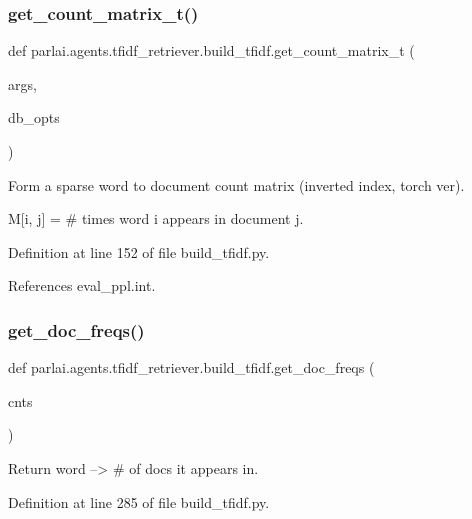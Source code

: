 \subsubsection{\texorpdfstring{get\+\_\+count\+\_\+matrix\+\_\+t()}{get\_count\_matrix\_t()}}
{\footnotesize\ttfamily def parlai.\+agents.\+tfidf\+\_\+retriever.\+build\+\_\+tfidf.\+get\+\_\+count\+\_\+matrix\+\_\+t (\begin{DoxyParamCaption}\item[{}]{args,  }\item[{}]{db\+\_\+opts }\end{DoxyParamCaption})}

\begin{DoxyVerb}Form a sparse word to document count matrix (inverted index, torch ver).

M[i, j] = # times word i appears in document j.
\end{DoxyVerb}
 

Definition at line 152 of file build\+\_\+tfidf.\+py.



References eval\+\_\+ppl.\+int.

\mbox{\label{namespaceparlai_1_1agents_1_1tfidf__retriever_1_1build__tfidf_ac6883ed21006848661f6c748f91aff56}} 
\subsubsection{\texorpdfstring{get\+\_\+doc\+\_\+freqs()}{get\_doc\_freqs()}}
{\footnotesize\ttfamily def parlai.\+agents.\+tfidf\+\_\+retriever.\+build\+\_\+tfidf.\+get\+\_\+doc\+\_\+freqs (\begin{DoxyParamCaption}\item[{}]{cnts }\end{DoxyParamCaption})}

\begin{DoxyVerb}Return word --> # of docs it appears in.\end{DoxyVerb}
 

Definition at line 285 of file build\+\_\+tfidf.\+py.



